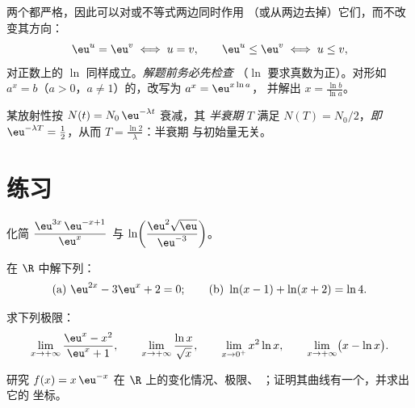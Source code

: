 \begin{method}\label{met:g12:exp:equations}
两个都严格，因此可以对或不等式两边同时作用
（或从两边去掉）它们，而不改变其方向：
\[
\eu^{u} = \eu^{v} \iff u = v, \qquad
\eu^{u} \leq \eu^{v} \iff u \leq v,
\]
对正数上的 $\ln$ 同样成立。\emph{解题前务必先检查
}（$\ln$ 要求真数为正）。对形如
$a^x = b$（$a>0$，$a \neq 1$）的，改写为 $a^x = \eu^{x\ln a}$，
并解出 $x = \frac{\ln b}{\ln a}$。
\end{method}

\begin{example}\label{ex:g12:exp:halflife}
某放射性按 $N(t) = N_0\,\eu^{-\lambda t}$ 衰减，其
\emph{半衰期} $T$ 满足 $N(T) = N_0/2$，\emph{即}
$\eu^{-\lambda T} = \frac12$，从而 $T = \frac{\ln 2}{\lambda}$：半衰期
与初始量无关。
\end{example}

\section{练习}

\begin{exercise}[$\star$]\label{exo:g12:exp:1}
化简
$\dfrac{\eu^{3x}\,\eu^{-x+1}}{\eu^{x}}$ 与
$\ln\!\left(\dfrac{\eu^2\sqrt{\eu}}{\eu^{-3}}\right)$。
\end{exercise}

\begin{exercise}[$\star$]\label{exo:g12:exp:2}
在 $\R$ 中解下列：
\[
\text{(a) } \eu^{2x} - 3\eu^{x} + 2 = 0;
\qquad
\text{(b) } \ln(x - 1) + \ln(x + 2) = \ln 4 .
\]
\end{exercise}

\begin{exercise}[$\star$]\label{exo:g12:exp:3}
求下列极限：
\[
\lim_{x\to+\infty} \frac{\eu^x - x^2}{\eu^x + 1}, \qquad
\lim_{x\to+\infty} \frac{\ln x}{\sqrt x}, \qquad
\lim_{x\to0^+} x^2 \ln x, \qquad
\lim_{x\to+\infty} \bigl(x - \ln x\bigr).
\]
\end{exercise}

\begin{exercise}[$\star\star$]\label{exo:g12:exp:4}
研究 $f(x) = x\,\eu^{-x}$ 在 $\R$ 上的变化情况、极限、
；证明其曲线有一个，并求出它的
坐标。
\end{exercise}

